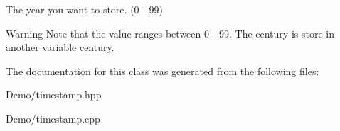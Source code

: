 The year you want to store. (0 -\/ 99) 

\begin{DoxyWarning}{Warning}
Note that the value ranges between 0 -\/ 99. The century is store in another variable \mbox{\hyperlink{classtimestamp_afe83888ffa38c1615a3d12b012f235b3}{century}}. 
\end{DoxyWarning}


The documentation for this class was generated from the following files\+:\begin{DoxyCompactItemize}
\item 
Demo/timestamp.\+hpp\item 
Demo/timestamp.\+cpp\end{DoxyCompactItemize}

